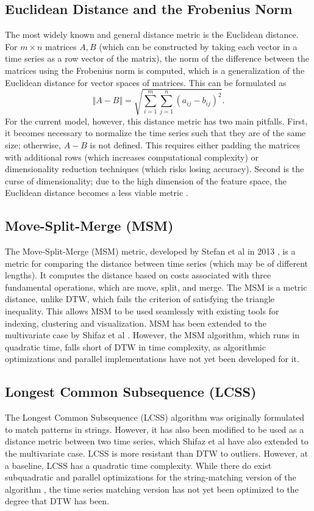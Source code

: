 \subsection{Euclidean Distance and the Frobenius Norm}
The most widely known and general distance metric is the Euclidean distance. For $m\times n$ matrices $A, B$ (which can be constructed by taking each vector in a time series as a row vector of the matrix), the norm of the difference between the matrices using the Frobenius norm is computed, which is a generalization of the Euclidean distance for vector spaces of matrices. This can be formulated as
\[
    \Vert A-B \Vert = \sqrt{\sum_{i=1}^m \sum_{j=1}^n (a_{ij}-b_{ij})^2}.
\]
For the current model, however, this distance metric has two main pitfalls. First, it becomes necessary to normalize the time series such that they are of the same size; otherwise, $A-B$ is not defined. This requires either padding the matrices with additional rows (which increases computational complexity) or dimensionality reduction techniques (which risks losing accuracy). Second is the curse of dimensionality; due to the high dimension of the feature space, the Euclidean distance becomes a less viable metric \cite{peng2025interpretingcursedimensionalitydistance}.

\subsection{Move-Split-Merge (MSM)}
The Move-Split-Merge (MSM) metric, developed by Stefan et al in 2013 \cite{msm}, is a metric for comparing the distance between time series (which may be of different lengths). It computes the distance based on costs associated with three fundamental operations, which are move, split, and merge. The MSM is a metric distance, unlike DTW, which fails the criterion of satisfying the triangle inequality. This allows MSM to be used seamlessly with existing tools for indexing, clustering and visualization. MSM has been extended to the multivariate case by Shifaz et al \cite{shifaz}. However, the MSM algorithm, which runs in quadratic time, falls short of DTW in time complexity, as algorithmic optimizations and parallel implementations have not yet been developed for it.

\subsection{Longest Common Subsequence (LCSS)}
The Longest Common Subsequence (LCSS) algorithm was originally formulated to match patterns in strings. However, it has also been modified to be used as a distance metric between two time series, which Shifaz et al \cite{shifaz} have also extended to the multivariate case. LCSS is more resistant than DTW to outliers. However, at a baseline, LCSS has a quadratic time complexity. While there do exist subquadratic and parallel optimizations for the string-matching version of the algorithm \cite{nandan}\cite{duraj}, the time series matching version has not yet been optimized to the degree that DTW has been.

